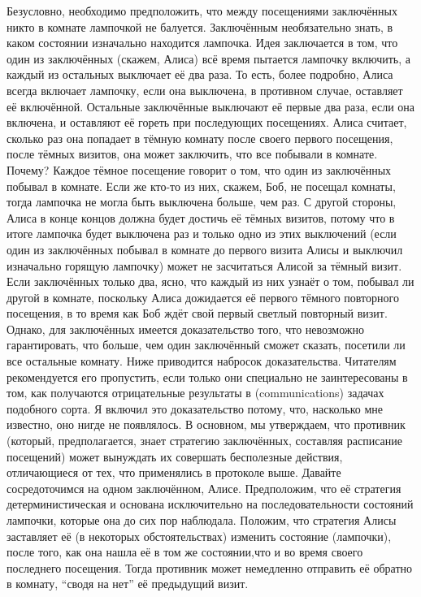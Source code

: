    Безусловно, необходимо предположить, что между посещениями заключённых никто в комнате  лампочкой не балуется. Заключённым необязательно знать, в каком состоянии изначально находится лампочка. Идея заключается в том, что один из заключённых (скажем, Алиса) всё время пытается лампочку включить, а  каждый из остальных выключает её два раза. 
   То есть, более подробно,  Алиса всегда включает лампочку, если она выключена, в противном случае, оставляет её включённой. Остальные заключённые выключают её первые два раза, если она включена, и оставляют её гореть при последующих посещениях.
   Алиса считает, сколько раз она попадает в тёмную комнату после своего первого 
посещения, после  тёмных визитов, она может заключить, что все побывали в комнате. Почему? Каждое тёмное посещение говорит о том,  что один из заключённых побывал в комнате. Если же кто-то из них, скажем, Боб, не посещал комнаты, тогда лампочка не могла быть выключена больше, чем  раз.  С другой стороны, Алиса в конце концов должна будет достичь её  тёмных визитов, потому что в итоге лампочка будет выключена 
 раз и только одно из этих выключений (если один из заключённых побывал в комнате до первого визита Алисы и выключил изначально горящую лампочку) может не засчитаться Алисой за тёмный визит.
   Если заключённых только два, ясно, что каждый из них узнаёт о том, побывал ли другой в комнате, поскольку Алиса дожидается её первого тёмного повторного посещения, в то время как Боб ждёт свой первый светлый повторный визит.
Однако,  для  заключённых  имеется доказательство того, что невозможно гарантировать, что больше, чем один заключённый сможет сказать, посетили ли все остальные  комнату.  Ниже приводится набросок доказательства. Читателям рекомендуется его пропустить, если только они специально не заинтересованы в том, как получаются отрицательные  результаты в (communications) задачах подобного сорта. Я включил это доказательство потому, что, насколько мне известно, оно нигде не появлялось.
    В основном, мы утверждаем, что противник (который, предполагается, 
 знает стратегию заключённых, составляя расписание посещений)  может вынуждать их совершать бесполезные действия, отличающиеся от тех, что применялись в протоколе выше.
   Давайте сосредоточимся на одном заключённом, Алисе. Предположим, что её стратегия детерминистическая и основана исключительно на последовательности состояний лампочки, которые она до сих пор наблюдала.
  Положим, что стратегия Алисы заставляет её (в некоторых обстоятельствах) изменить состояние (лампочки), после того, как она нашла её в том же состоянии,что и во время своего последнего посещения. Тогда  противник может немедленно отправить её обратно в комнату, “сводя на нет” её предыдущий визит.
